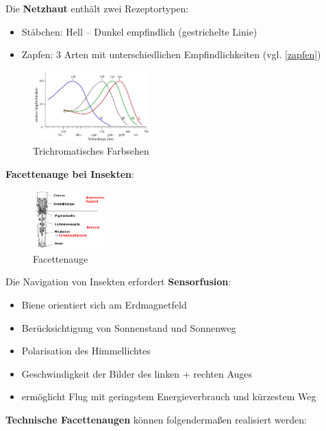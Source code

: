 Die \textbf{Netzhaut} enthält zwei Rezeptortypen:
\begin{itemize}
\item Stäbchen: Hell – Dunkel empfindlich (gestrichelte Linie)
\item Zapfen: 3 Arten mit unterschiedlichen Empfindlichkeiten (vgl. \autoref{zapfen})
\end{itemize}
\begin{figure}[h!]
	\centering
	\includegraphics[width=0.4\textwidth]{figures/ch04_zapfen.png}
	\caption{Trichromatisches Farbsehen}
	\label{zapfen}
\end{figure}
\textbf{Facettenauge bei Insekten}:
\begin{figure}[h!]
	\centering
	\includegraphics[width=0.25\textwidth]{figures/ch04_facette.png}
	\caption{Facettenauge}
	\label{facette}
\end{figure}
Die Navigation von Insekten erfordert \glqq \textbf{Sensorfusion}\grqq: 
\begin{itemize}
\item Biene orientiert sich am Erdmagnetfeld
\item Berücksichtigung von Sonnenstand und Sonnenweg
\item Polarisation des Himmellichtes
\item Geschwindigkeit der Bilder des linken + rechten Auges
\item ermöglicht Flug mit geringstem Energieverbrauch und kürzestem Weg
\end{itemize}
\textbf{Technische Facettenaugen} können folgendermaßen realisiert werden:
